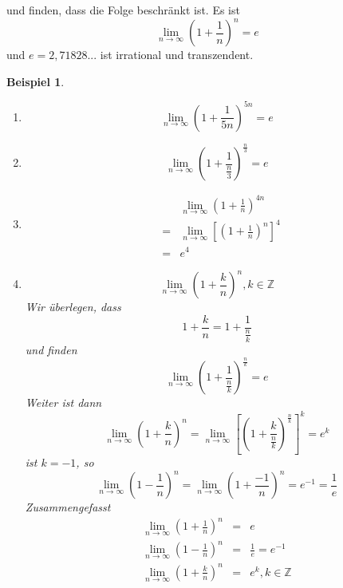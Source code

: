 \documentclass{report}
\newtheorem{myexample}{Beispiel}
\begin{document}
und finden, dass die Folge beschränkt ist. Es ist
\begin{equation*}\boxed{\lim_{n \to \infty} (1 + \frac{1}{n})^n = e}\end{equation*}
und $e = 2,71828...$ ist irrational und transzendent.
\begin{myexample}
\begin{enumerate}
\item \begin{equation*}\lim_{n \to \infty} ( 1 + \frac{1}{5n})^{5n} = e\end{equation*}
\item \begin{equation*}\lim_{n \to \infty} ( 1 + \frac{1}{\frac{n}{3}})^{\frac{n}{3}} = e\end{equation*}
\item 
	\begin{eqnarray*}
		&&\lim_{n \to \infty} ( 1 + \frac{1}{n})^{4n} \\
		&=& \lim_{n \to \infty}[ ( 1 + \frac{1}{n})^{n}]^4\\ 
		&=& e^4
	\end{eqnarray*}
\item
\begin{equation*}\lim_{n \to \infty} ( 1 + \frac{k}{n})^n, k \in \mathbb{Z}\end{equation*}
Wir überlegen, dass
\begin{equation*}1 + \frac{k}{n}  =1 + \frac{1}{\frac{n}{k}}\end{equation*}
und finden
\begin{equation*}\lim_{n \to \infty} ( 1 + \frac{1}{\frac{n}{k}})^\frac{n}{k} = e\end{equation*}
Weiter ist dann
\begin{equation*}\lim_{n \to \infty} (1 + \frac{k}{n})^n = \lim_{n \to \infty}[(1 + \frac{k}{\frac{n}{k}})^\frac{n}{k}]^k = e^k\end{equation*}
ist $k = -1$, so
\begin{equation*}\lim_{n \to \infty} (1 - \frac{1}{n})^n = \lim_{n \to \infty} (1 + \frac{-1}{n})^n = e^{-1} = \frac{1}{e}\end{equation*}
Zusammengefasst
\begin{eqnarray}\lim_{n \to \infty} (1 + \frac{1}{n})^n & = & e\\
\lim_{n \to \infty} (1 - \frac{1}{n})^n & = & \frac{1}{e} = e^{-1}\\
\lim_{n \to \infty} (1 + \frac{k}{n})^n & = & e^k, k \in \mathbb{Z}\end{eqnarray}
\end{enumerate}\end{myexample}
\newpage
\end{document}
